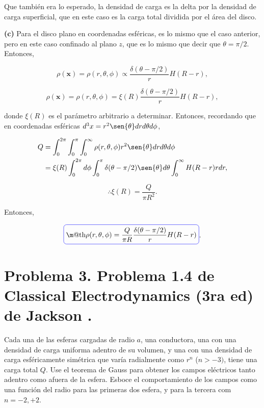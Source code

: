 \documentclass[a4paper,11pt]{article}
\makeatletter
\numberwithin{equation}{section}
\newcommand*{\boxcolor}{blue}
\renewcommand{\boxed}[1]{\textcolor{\boxcolor}{%
\tikz[baseline={([yshift=-1ex]current bounding box.center)}] \node [rectangle, minimum width=1ex,rounded corners,draw] {\normalcolor\m@th$\displaystyle#1$};}}
\makeatother
\begin{document}
Que también era lo esperado, la densidad de carga es la delta por la densidad de 
carga superficial, que en este caso es la carga total dividida por el área del 
disco.

\vspace{.3cm}

\textbf{(c)} Para el disco plano en coordenadas esféricas, es lo mismo que el caso 
anterior, pero en este caso confinado al plano $z$, que es lo mismo que decir que 
$\theta = \pi/2$. Entonces, 

\begin{equation}
 \rho(\mathbf{x}) =  \rho(r,\theta,\phi) \propto 
 \frac{\delta(\theta - \pi/2)}{r}H(R-r),
\end{equation}

\begin{equation}
 \rho(\mathbf{x}) =  \rho(r,\theta,\phi)  = 
 \xi(R)\frac{\delta(\theta - \pi/2)}{r}H(R-r),
\end{equation}

donde $\xi(R)$ es el parámetro arbitrario a determinar. Entonces, recordando que 
en coordenadas esféricas $d^3x = r^2\sen{\theta}dr d\theta d\phi$,

\begin{align*}
 Q &= \int_0^{2\pi} \int_0^\pi \int_0^\infty 
  \rho(r,\theta,\phi) r^2\sen{\theta}dr d\theta d\phi \\
  &=   \xi(R)\int_0^{2\pi}d\phi \int_0^\pi \delta(\theta - \pi/2)\sen{\theta}d\theta 
  \int_0^\infty H(R-r)rdr,
\end{align*}

\begin{equation}
 \therefore \xi(R) = \frac{Q}{\pi R^2}.
\end{equation}

Entonces,

\begin{equation}
 \boxed{\rho(r,\theta,\phi) = \frac{Q}{\pi R}\frac{\delta(\theta - \pi/2)}{r}H(R-r)}.
\end{equation}

\section{Problema 3. Problema 1.4 de Classical Electrodynamics (3ra ed) de 
Jackson \cite{jackson}.}

Cada una de las esferas cargadas de radio $a$, una conductora, una con una densidad 
de carga uniforma adentro de su volumen, y una con una densidad de carga esféricamente 
simétrica que varía radialmente como $r^n$ ($n > -3)$, tiene una carga total $Q$. 
Use el teorema de Gauss para obtener los campos eléctricos tanto adentro como afuera 
de la esfera. Esboce el comportamiento de los campos como una función del radio 
para las primeras dos esfera, y para la tercera com $n= -2,+2$. 
\end{document}
